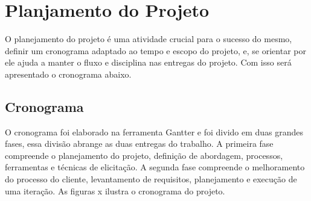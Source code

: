 \chapter[Planjamento do Projeto]{Planjamento do Projeto}\label{cap7}

O planejamento do projeto é uma atividade crucial para o sucesso do mesmo, definir
um cronograma adaptado ao tempo e escopo do projeto, e, se orientar por ele ajuda
a manter o fluxo e disciplina nas entregas do projeto. Com isso será apresentado o cronograma abaixo.

\section{Cronograma}

O cronograma foi elaborado na ferramenta Gantter e foi divido em duas grandes fases,
essa divisão abrange as duas entregas do trabalho. A primeira fase compreende o planejamento
do projeto, definição de abordagem, processos, ferramentas e técnicas de elicitação.
A segunda fase compreende o melhoramento do processo do cliente, levantamento de requisitos,
planejamento e execução de uma iteração. As figuras x ilustra o cronograma do projeto.
